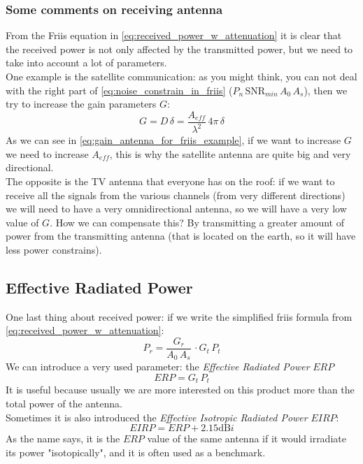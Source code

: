 \subsubsection*{Some comments on receiving antenna}
From the Friis equation in \cref{eq:received_power_w_attenuation} it is clear that the received power is not only affected by the transmitted power, but we need to take into account a lot of parameters.\\
One example is the satellite communication: as you might think, you can not deal with the right part of \cref{eq:noise_constrain_in_friis} ($P_{n} \, \text{SNR}_{min} \,A_0\,A_s$), then we try to increase the gain parameters $G$:
\begin{equation}\label{eq:gain_antenna_for_friis_example}
    G=D\,\delta  =\frac{A_{eff}}{\lambda^2}\,4\pi\,\delta
\end{equation}
As we can see in \cref{eq:gain_antenna_for_friis_example}, if we want to increase $G$ we need to increase $A_{eff}$, this is why the satellite antenna are quite big and very directional.\\
The opposite is the TV antenna that everyone has on the roof: if we want to receive all the signals from the various channels (from very different directions) we will need to have a very omnidirectional antenna, so we will have a very low value of $G$. How we can compensate this? By transmitting a greater amount of power from the transmitting antenna (that is located on the earth, so it will have less power constrains).
\subsection*{Effective Radiated Power}
One last thing about received power: if we write the simplified friis formula from \cref{eq:received_power_w_attenuation}:
\begin{equation}\label{eq:friis_formula_simple}
    P_r=\frac{G_r}{A_0\,A_s}\,\cdot G_t\,P_t
\end{equation}
We can introduce a very used parameter: the \emph{Effective Radiated Power} $ERP$
\begin{equation}\label{eq:erp}
    ERP=G_t\,P_t
\end{equation}
It is useful because usually we are more interested on this product more than the total power of the antenna.\\
Sometimes it is also introduced the \emph{Effective Isotropic Radiated Power} $EIRP$:
\begin{equation}\label{eq:eirp}
    EIRP=ERP+2.15\si{\deci\bel i}
\end{equation}
As the name says, it is the $ERP$ value of the same antenna if it would irradiate its power "isotopically", and it is often used as a benchmark.
